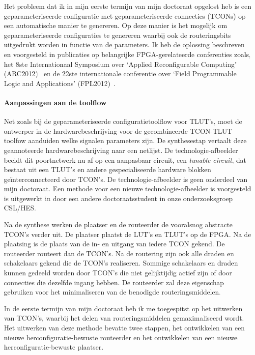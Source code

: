 \documentclass[a4paper,oneside,12pt]{article}
\begin{document}
Het probleem dat ik in mijn eerste termijn van mijn doctoraat opgelost heb  is een geparameteriseerde configuratie met geparameteriseerde connecties (TCONs) op een automatische manier te genereren. Op deze manier is het mogelijk om geparameteriseerde configuraties te genereren waarbij ook de routeringsbits uitgedrukt worden in functie van de parameters.
Ik heb de oplossing beschreven en voorgesteld in publicaties op belangrijke FPGA-gerelateerde conferenties zoals, het 8ste Internationaal Symposium over `Applied Reconfigurable Computing' (ARC2012)~\cite{connectionrouter} en de 22ste internationale conferentie over `Field Programmable Logic and Applications' (FPL2012)~\cite{vansteenkiste2012}.

\paragraph{Aanpassingen aan de toolflow}

Net zoals bij de geparameteriseerde configuratietoolflow voor TLUT's, moet de ontwerper in de hardwarebeschrijving voor de gecombineerde TCON-TLUT toolfow aanduiden welke signalen parameters zijn. De synthesestap vertaalt deze geannoteerde hardwarebeschrijving naar een netlijst. %
De technologie-afbeelder beeldt dit poortnetwerk nu af op een aanpasbaar circuit, een {\em tunable circuit}, dat bestaat uit een TLUT's en andere gespecialiseerde hardware blokken ge\"interconnecteerd door TCON's. De technologie-afbeelder is geen onderdeel van mijn doctoraat. Een methode voor een nieuwe technologie-afbeelder is voorgesteld is uitgewerkt in \cite{tconmap} door een andere doctoraatsstudent in onze onderzoeksgroep CSL/HES.

Na de synthese werken de plaatser en de routeerder de vooralsnog abstracte TCON's verder uit. De plaatser plaatst de LUT's en TLUT's op de FPGA. Na de plaatsing is de plaats van de in- en uitgang van iedere TCON gekend. De routeerder routeert dan de TCON's. Na de routering zijn ook alle draden en schakelaars gekend die de TCON's realiseren. Sommige schakelaars en draden kunnen gedeeld worden door TCON's die niet gelijktijdig actief zijn of door connecties die dezelfde ingang hebben. De routeerder zal deze eigenschap gebruiken voor het minimaliseren van de benodigde routeringsmiddelen. %

In de eerste termijn van mijn doctoraat heb ik me toegespitst op het uitwerken van TCON's, waarbij het delen van routeringsmiddelen gemaximaliseerd wordt. Het uitwerken van deze methode bevatte twee stappen, het ontwikkelen van een nieuwe herconfiguratie-bewuste routeerder en het ontwikkelen van een nieuwe herconfiguratie-bewuste plaatser.
\end{document}
